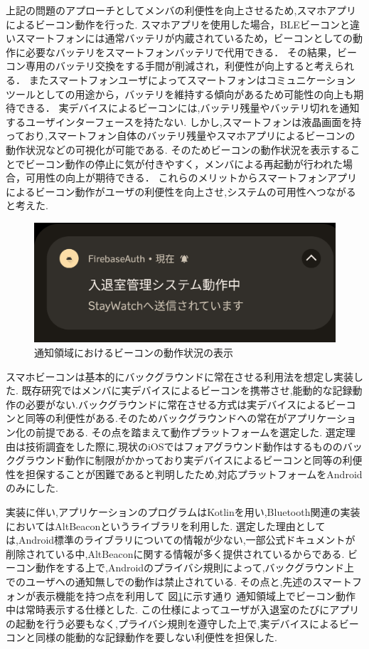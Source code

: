 上記の問題のアプローチとしてメンバの利便性を向上させるため,スマホアプリによるビーコン動作を行った.
スマホアプリを使用した場合，BLEビーコンと違いスマートフォンには通常バッテリが内蔵されているため，ビーコンとしての動作に必要なバッテリをスマートフォンバッテリで代用できる．
その結果，ビーコン専用のバッテリ交換をする手間が削減され，利便性が向上すると考えられる．
またスマートフォンユーザによってスマートフォンはコミュニケーションツールとしての用途から，バッテリを維持する傾向があるため可能性の向上も期待できる．
実デバイスによるビーコンには,バッテリ残量やバッテリ切れを通知するユーザインターフェースを持たない.
しかし,スマートフォンは液晶画面を持っており,スマートフォン自体のバッテリ残量やスマホアプリによるビーコンの動作状況などの可視化が可能である.
そのためビーコンの動作状況を表示することでビーコン動作の停止に気が付きやすく，メンバによる再起動が行われた場合，可用性の向上が期待できる．
これらのメリットからスマートフォンアプリによるビーコン動作がユーザの利便性を向上させ,システムの可用性へつながると考えた.


\begin{figure}[tbh]
  \centering
  \includegraphics[width=12cm]{image/AppNofication.png}
  \caption{通知領域におけるビーコンの動作状況の表示}
  \label{fig:AppNofication}
\end{figure}


スマホビーコンは基本的にバックグラウンドに常在させる利用法を想定し実装した.
既存研究ではメンバに実デバイスによるビーコンを携帯させ,能動的な記録動作の必要がない.バックグラウンドに常在させる方式は実デバイスによるビーコンと同等の利便性がある.そのためバックグラウンドへの常在がアプリケーション化の前提である.
その点を踏まえて動作プラットフォームを選定した.
選定理由は技術調査をした際に,現状のiOSではフォアグラウンド動作はするもののバックグラウンド動作に制限がかかっており実デバイスによるビーコンと同等の利便性を担保することが困難であると判明したため,対応プラットフォームをAndroidのみにした.

実装に伴い,アプリケーションのプログラムはKotlinを用い,Bluetooth関連の実装においてはAltBeaconというライブラリを利用した.
選定した理由としては,Android標準のライブラリについての情報が少ない,一部公式ドキュメントが削除されている中,AltBeaconに関する情報が多く提供されているからである.
ビーコン動作をする上で,Androidのプライバシ規則によって,バックグラウンド上でのユーザへの通知無しでの動作は禁止されている.
その点と,先述のスマートフォンが表示機能を持つ点を利用して 図\ref{fig:AppNofication}に示す通り   通知領域上でビーコン動作中は常時表示する仕様とした.
この仕様によってユーザが入退室のたびにアプリの起動を行う必要もなく,プライバシ規則を遵守した上で,実デバイスによるビーコンと同様の能動的な記録動作を要しない利便性を担保した.

